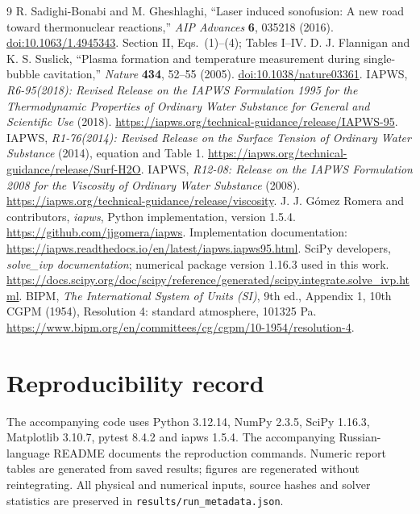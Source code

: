 \documentclass[10pt,a4paper]{article}
\begin{document}
\newpage
\begin{thebibliography}{9}\small
{} R. Sadighi-Bonabi and M. Gheshlaghi, ``Laser induced sonofusion: A new road toward thermonuclear reactions,'' \emph{AIP Advances} \textbf{6}, 035218 (2016). \href{https://doi.org/10.1063/1.4945343}{doi:10.1063/1.4945343}. Section II, Eqs.~(1)--(4); Tables I--IV.
 D. J. Flannigan and K. S. Suslick, ``Plasma formation and temperature measurement during single-bubble cavitation,'' \emph{Nature} \textbf{434}, 52--55 (2005). \href{https://doi.org/10.1038/nature03361}{doi:10.1038/nature03361}.
 IAPWS, \emph{R6-95(2018): Revised Release on the IAPWS Formulation 1995 for the Thermodynamic Properties of Ordinary Water Substance for General and Scientific Use} (2018). \url{https://iapws.org/technical-guidance/release/IAPWS-95}.
 IAPWS, \emph{R1-76(2014): Revised Release on the Surface Tension of Ordinary Water Substance} (2014), equation and Table 1. \url{https://iapws.org/technical-guidance/release/Surf-H2O}.
 IAPWS, \emph{R12-08: Release on the IAPWS Formulation 2008 for the Viscosity of Ordinary Water Substance} (2008). \url{https://iapws.org/technical-guidance/release/viscosity}.
 J. J. G\'omez Romera and contributors, \emph{iapws}, Python implementation, version 1.5.4. \url{https://github.com/jjgomera/iapws}. Implementation documentation: \url{https://iapws.readthedocs.io/en/latest/iapws.iapws95.html}.
 SciPy developers, \emph{solve\_ivp documentation}; numerical package version 1.16.3 used in this work. \url{https://docs.scipy.org/doc/scipy/reference/generated/scipy.integrate.solve_ivp.html}.
 BIPM, \emph{The International System of Units (SI)}, 9th ed., Appendix 1, 10th CGPM (1954), Resolution 4: standard atmosphere, 101325 Pa. \url{https://www.bipm.org/en/committees/cg/cgpm/10-1954/resolution-4}.
\end{thebibliography}

\section*{Reproducibility record}
The accompanying code uses Python 3.12.14, NumPy 2.3.5, SciPy 1.16.3, Matplotlib 3.10.7, pytest 8.4.2 and iapws 1.5.4. The accompanying Russian-language README documents the reproduction commands. Numeric report tables are generated from saved results; figures are regenerated without reintegrating. All physical and numerical inputs, source hashes and solver statistics are preserved in \texttt{results/run\_metadata.json}.
\end{document}

